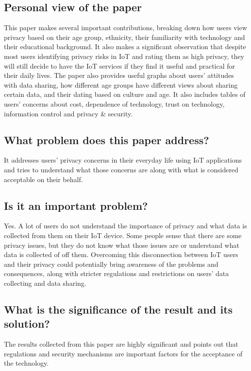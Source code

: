 \documentclass[11pt,a4paper]{article}
\begin{document}
\subsection*{Personal view of the paper}
This paper makes several important contributions, breaking down how users view privacy based on their age group, ethnicity, their familiarity with technology and their educational background. It also makes a significant observation that despite most users identifying privacy risks in IoT and rating them as high privacy, they will still decide to have the IoT services if they find it useful and practical for their daily lives. The paper also provides useful graphs about users’ attitudes with data sharing, how different age groups have different views about sharing certain data, and their dating based on culture and age. It also includes tables of users’ concerns about cost, dependence of technology, trust on technology, information control and privacy \& security.

\subsection*{What problem does this paper address?}
It addresses users’ privacy concerns in their everyday life using IoT applications and tries to understand what those concerns are along with what is considered acceptable on their behalf.

\subsection*{Is it an important problem?}
Yes. A lot of users do not understand the importance of privacy and what data is collected from them on their IoT device. Some people sense that there are some privacy issues, but they do not know what those issues are or understand what data is collected of off them. Overcoming this disconnection between IoT users and their privacy could potentially bring awareness of the problems and consequences, along with stricter regulations and restrictions on users’ data collecting and data sharing.

\subsection*{What is the significance of the result and its solution?}
The results collected from this paper are highly significant and points out that regulations and security mechanisms are important factors for the acceptance of the technology. 
\end{document}
